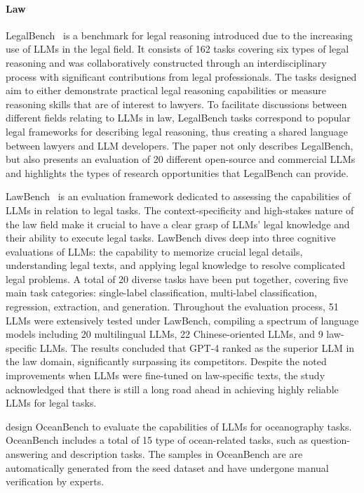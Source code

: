 \paragraph{Law}
LegalBench~\citep{guha2023legalbench} is a benchmark for legal reasoning introduced due to the increasing use of LLMs in the legal field. It consists of 162 tasks covering six types of legal reasoning and was collaboratively constructed through an interdisciplinary process with significant contributions from legal professionals. The tasks designed aim to either demonstrate practical legal reasoning capabilities or measure reasoning skills that are of interest to lawyers. To facilitate discussions between different fields relating to LLMs in law, LegalBench tasks correspond to popular legal frameworks for describing legal reasoning, thus creating a shared language between lawyers and LLM developers. The paper not only describes LegalBench, but also presents an evaluation of 20 different open-source and commercial LLMs and highlights the types of research opportunities that LegalBench can provide.

LawBench~\citep{fei2023lawbench} is an evaluation framework dedicated to assessing the capabilities of LLMs in relation to legal tasks. The context-specificity and high-stakes nature of the law field make it crucial to have a clear grasp of LLMs' legal knowledge and their ability to execute legal tasks. 
LawBench dives deep into three cognitive evaluations of LLMs: the capability to memorize crucial legal details, understanding legal texts, and applying legal knowledge to resolve complicated legal problems. A total of 20 diverse tasks have been put together, covering five main task categories: single-label classification, multi-label classification, regression, extraction, and generation. 
Throughout the evaluation process, 51 LLMs were extensively tested under LawBench, compiling a spectrum of language models including 20 multilingual LLMs, 22 Chinese-oriented LLMs, and 9 law-specific LLMs. The results concluded that GPT-4 ranked as the superior LLM in the law domain, significantly surpassing its competitors. Despite the noted improvements when LLMs were fine-tuned on law-specific texts, the study acknowledged that there is still a long road ahead in achieving highly reliable LLMs for legal tasks.

\citet{bi2023oceangpt}  design OceanBench to evaluate the capabilities of LLMs for oceanography tasks.
OceanBench includes a total of 15 type of ocean-related tasks, such as question-answering and description tasks.
The samples in OceanBench are are automatically generated from the seed dataset and have undergone manual verification by experts.